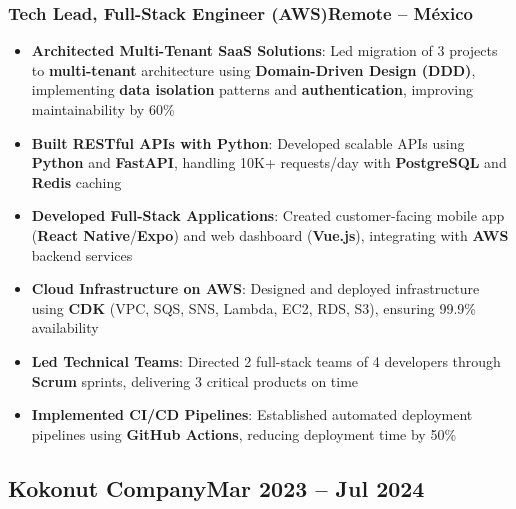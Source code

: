\documentclass[a4paper,10pt]{article}
\newcommand{\kw}[1]{\textbf{\textcolor{keyword}{#1}}}
\newcommand{\tech}[1]{\textbf{\textcolor{tech}{#1}}}
\begin{document}
\subsubsection*{Tech Lead, Full-Stack Engineer (AWS)\hfill Remote -- México}
\begin{itemize}[noitemsep, leftmargin=*]
    \item \textbf{Architected Multi-Tenant SaaS Solutions}: Led migration of 3 projects to \kw{multi-tenant} architecture using \kw{Domain-Driven Design (DDD)}, implementing \kw{data isolation} patterns and \kw{authentication}, improving maintainability by 60\%
    \item \textbf{Built RESTful APIs with Python}: Developed scalable APIs using \tech{Python} and \tech{FastAPI}, handling 10K+ requests/day with \kw{PostgreSQL} and \tech{Redis} caching
    \item \textbf{Developed Full-Stack Applications}: Created customer-facing mobile app (\tech{React Native}/\tech{Expo}) and web dashboard (\tech{Vue.js}), integrating with \tech{AWS} backend services
    \item \textbf{Cloud Infrastructure on AWS}: Designed and deployed infrastructure using \tech{CDK} (VPC, SQS, SNS, Lambda, EC2, RDS, S3), ensuring 99.9\% availability
    \item \textbf{Led Technical Teams}: Directed 2 full-stack teams of 4 developers through \kw{Scrum} sprints, delivering 3 critical products on time
    \item \textbf{Implemented CI/CD Pipelines}: Established automated deployment pipelines using \tech{GitHub Actions}, reducing deployment time by 50\%
\end{itemize}

\subsection*{Kokonut Company\hfill\textbf{Mar 2023 -- Jul 2024}}
\end{document}
